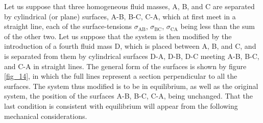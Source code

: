 \documentclass[12pt]{article}
\begin{document}
Let us suppose that three homogeneous fluid masses, A, B, and C are separated by cylindrical (or plane) surfaces, A-B, B-C, C-A, which at first meet in a straight line, each of the surface-tensions $\sigma_{\text{AB}}$, $\sigma_{\text{BC}}$, $\sigma_{\text{CA}}$ being less than the sum of the other two. Let us suppose that the system is then modified by the introduction of a fourth fluid mass D, which is placed between A, B, and C, and is separated from them by cylindrical surfaces D-A, D-B, D-C meeting A-B, B-C, and C-A in straight lines. The general form of the surfaces is shown by figure \ref{fig_14}, in which the full lines represent a section perpendicular to all the surfaces. The system thus modified is to be in equilibrium, as well as the original system, the position of the surfaces A-B, B-C, C-A, being unchanged. That the last condition is consistent with equilibrium will appear from the following mechanical considerations.
\end{document}
